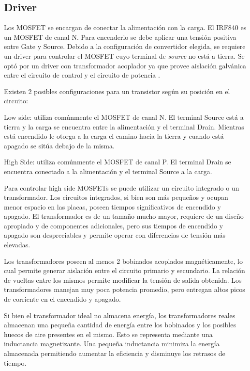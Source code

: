 \subsection{Driver}

Los MOSFET se encargan de conectar la alimentación con la carga. El IRF840 es un MOSFET de canal N. 
Para encenderlo se debe aplicar una tensión positiva entre Gate y Source. 
Debido a la configuración de convertidor elegida, se requiere un driver para controlar el MOSFET cuyo terminal de \textit{source} no está a tierra. Se optó por un driver con transformador acoplador ya que provee aislación galvánica entre el circuito de control y el circuito de potencia \cite{gatedrivers}.

Existen 2 posibles configuraciones para un transistor según su posición en el circuito:

Low side: utiliza comúnmente el MOSFET de canal N. 
El terminal Source está a tierra y la carga se encuentra entre la alimentación y el terminal Drain. 
Mientras está encendido le otorga a la carga el camino hacia la tierra y cuando está apagado se sitúa debajo de la misma. 

High Side: utiliza comúnmente el MOSFET de canal P. 
El terminal Drain se encuentra conectado a la alimentación y el terminal Source a la carga. 


Para controlar high side MOSFETs se puede utilizar un circuito integrado o un transformador. 
Los circuitos integrados, si bien son más pequeños y ocupan menor espacio en las placas, 
poseen tiempos significativos de encendido y apagado. 
El transformador es de un tamaño mucho mayor, requiere de un diseño apropiado y de componentes adicionales,
 pero sus tiempos de encendido y apagado son despreciables y permite operar con diferencias de tensión más elevadas.

Los transformadores poseen al menos 2 bobinados acoplados magnéticamente, 
lo cual permite generar aislación entre el circuito primario y secundario. 
La relación de vueltas entre los mismos permite modificar la tensión de salida obtenida. 
Los transformadores manejan muy poca potencia promedio, pero entregan altos picos de corriente en el encendido y apagado.

Si bien el transformador ideal no almacena energía, los transformadores reales 
almacenan una pequeña cantidad de energía entre los bobinados y los posibles huecos de aire presentes en el mismo. 
Esto se representa mediante una inductancia magnetizante. 
Una pequeña inductancia minimiza la energía almacenada permitiendo aumentar la eficiencia y disminuye los retrasos de tiempo. 

